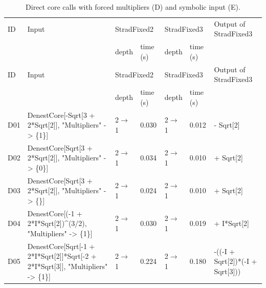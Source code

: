\begin{longtable}{@{}p{}>{\ttfamily\footnotesize\raggedright\arraybackslash}p{}p{}p{}p{}p{}>{\ttfamily\footnotesize\raggedright\arraybackslash}p{}@{}}
\caption{Direct core calls with forced multipliers (D) and symbolic input (E).}\label{tab:cmpDE}\\
\toprule ID & Input & \multicolumn{2}{l}{StradFixed2} & \multicolumn{2}{l}{StradFixed3} & Output of StradFixed3\\ & & depth & time (s) & depth & time (s) & \\\midrule\endfirsthead
\toprule ID & Input & \multicolumn{2}{l}{StradFixed2} & \multicolumn{2}{l}{StradFixed3} & Output of StradFixed3\\ & & depth & time (s) & depth & time (s) & \\\midrule\endhead
\bottomrule\endfoot
D01 & DenestCore[\allowbreak{}-Sqrt[\allowbreak{}3 +\allowbreak{} 2*\allowbreak{}Sqrt[\allowbreak{}2]\allowbreak{}]\allowbreak{},\allowbreak{} "Multipliers" -> \{1\}]\allowbreak{} & 2$\to$1 & 0.030 & 2$\to$1 & 0.012 & -1 -\allowbreak{} Sqrt[\allowbreak{}2]\allowbreak{}\\
D02 & DenestCore[\allowbreak{}Sqrt[\allowbreak{}3 +\allowbreak{} 2*\allowbreak{}Sqrt[\allowbreak{}2]\allowbreak{}]\allowbreak{},\allowbreak{} "Multipliers" -> \{0\}]\allowbreak{} & 2$\to$1 & 0.034 & 2$\to$1 & 0.010 & 1 +\allowbreak{} Sqrt[\allowbreak{}2]\allowbreak{}\\
D03 & DenestCore[\allowbreak{}Sqrt[\allowbreak{}3 +\allowbreak{} 2*\allowbreak{}Sqrt[\allowbreak{}2]\allowbreak{}]\allowbreak{},\allowbreak{} "Multipliers" -> \{\}]\allowbreak{} & 2$\to$1 & 0.024 & 2$\to$1 & 0.010 & 1 +\allowbreak{} Sqrt[\allowbreak{}2]\allowbreak{}\\
D04 & DenestCore[\allowbreak{}(\allowbreak{}-1 +\allowbreak{} 2*\allowbreak{}I*\allowbreak{}Sqrt[\allowbreak{}2]\allowbreak{})\allowbreak{}\textasciicircum{}\allowbreak{}(\allowbreak{}3/\allowbreak{}2)\allowbreak{},\allowbreak{} "Multipliers" -> \{1\}]\allowbreak{} & 2$\to$1 & 0.030 & 2$\to$1 & 0.019 & -5 +\allowbreak{} I*\allowbreak{}Sqrt[\allowbreak{}2]\allowbreak{}\\
D05 & DenestCore[\allowbreak{}Sqrt[\allowbreak{}-1 +\allowbreak{} 2*\allowbreak{}I*\allowbreak{}Sqrt[\allowbreak{}2]\allowbreak{}]\allowbreak{}*\allowbreak{}Sqrt[\allowbreak{}-2 +\allowbreak{} 2*\allowbreak{}I*\allowbreak{}Sqrt[\allowbreak{}3]\allowbreak{}]\allowbreak{},\allowbreak{} "Multipliers" -> \{1\}]\allowbreak{} & 2$\to$1 & 0.224 & 2$\to$1 & 0.180 & -(\allowbreak{}(\allowbreak{}-I +\allowbreak{} Sqrt[\allowbreak{}2]\allowbreak{})\allowbreak{}*\allowbreak{}(\allowbreak{}-I +\allowbreak{} Sqrt[\allowbreak{}3]\allowbreak{})\allowbreak{})\allowbreak{}\\

\end{longtable}
